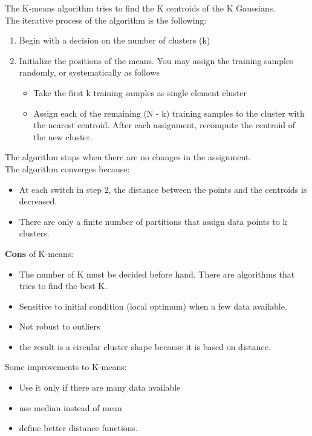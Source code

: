 The K-means algorithm tries to find the K centroids of the K Gaussians.\\
The iterative process of the algorithm is the following:
\begin{enumerate}
    \item Begin with a decision on the number of clusters (k)
    \item Initialize the positions of the means. You may assign the training samples randomly, or systematically as follows
    \begin{itemize}
        \item Take the first k training samples as single element cluster
        \item Assign each of the remaining (N - k) training samples to the cluster with the nearest centroid. After each assignment, recompute the centroid of the new cluster.
    \end{itemize}
\end{enumerate}
The algorithm stops when there are no changes in the assignment.\\
The algorithm converges because:
\begin{itemize}
    \item At each switch in step 2, the distance between the points and the centroids is decreased.
    \item There are only a finite number of partitions that assign data points to k clusters.
\end{itemize}

\textbf{Cons} of K-means:
\begin{itemize}
    \item The number of K must be decided before hand. There are algorithms that tries to find the best K.
    \item Sensitive to initial condition (local optimum) when a few data available. 
    \item Not robust to outliers
    \item the result is a circular cluster shape because it is based on distance.
\end{itemize}
Some improvements to K-means:
\begin{itemize}
    \item Use it only if there are many data available
    \item use median instead of mean
    \item define better distance functions.
\end{itemize}


